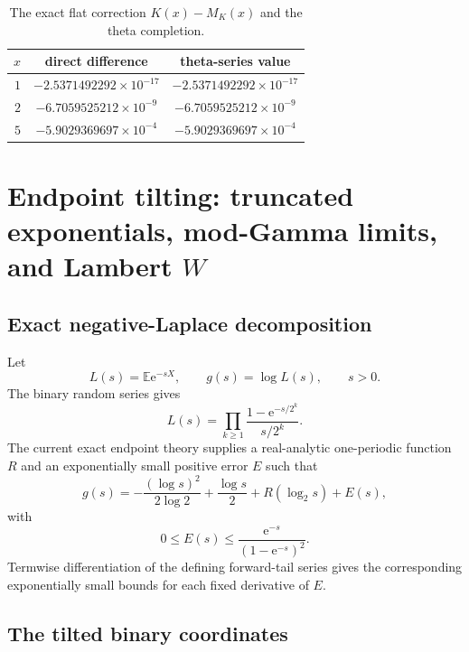\documentclass[11pt,oneside]{article}
\theoremstyle{definition}
\theoremstyle{remark}
\newcommand{\e}{\mathrm e}
\newcommand{\E}{\mathbb E}
\begin{document}
\begin{table}[ht]
\centering
\caption{The exact flat correction $K(x)-M_K(x)$ and the theta completion.}
\label{tab:theta-check}
\begin{tabular}{@{}rcc@{}}
\toprule
$x$ & direct difference & theta-series value\\
\midrule
$1$ & $-2.5371492292\times10^{-17}$ & $-2.5371492292\times10^{-17}$\\
$2$ & $-6.7059525212\times10^{-9}$  & $-6.7059525212\times10^{-9}$\\
$5$ & $-5.9029369697\times10^{-4}$  & $-5.9029369697\times10^{-4}$\\
\bottomrule
\end{tabular}
\end{table}

\section{Endpoint tilting: truncated exponentials, mod-Gamma limits, and Lambert $W$}

\subsection{Exact negative-Laplace decomposition}

Let
\begin{equation}\label{eq:L-g-def}
 L(s)=\E\e^{-sX},\qquad g(s)=\log L(s),\qquad s>0.
\end{equation}
The binary random series gives
\begin{equation}\label{eq:L-product}
 L(s)=\prod_{k\ge1}\frac{1-\e^{-s/2^k}}{s/2^k}.
\end{equation}
The current exact endpoint theory supplies a real-analytic one-periodic
function $R$ and an exponentially small positive error $E$ such that
\begin{equation}\label{eq:g-decomp}
 \boxed{
 g(s)=-\frac{(\log s)^2}{2\log2}+\frac{\log s}{2}
 +R(\log_2s)+E(s),}
\end{equation}
with
\begin{equation}\label{eq:E-bound}
 0\le E(s)\le\frac{\e^{-s}}{(1-\e^{-s})^2}.
\end{equation}
Termwise differentiation of the defining forward-tail series gives the
corresponding exponentially small bounds for each fixed derivative of $E$.

\subsection{The tilted binary coordinates}
\end{document}
